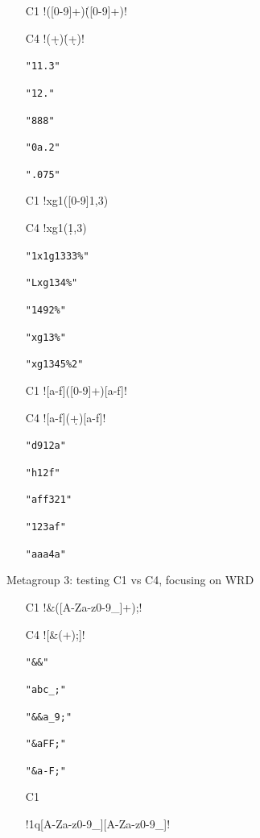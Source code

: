 \begin{footnotesize}
\vspace{-5mm}
\begin{multicols}{3}
\begin{itemize}[noitemsep,topsep=0pt]
\item[C1] \cverb!([0-9]+)\.([0-9]+)!
\item[C4] \cverb!(\d+)\.(\d+)!
\item[] \verb|"11.3"|
\item[] \verb|"12."|
\item[] \verb|"888"|
\item[] \verb|"0a.2"|
\item[] \verb|".075"|
\item[C1] \cverb!xg1([0-9]{1,3})%
\item[C4] \cverb!xg1(\d{1,3})%
\item[] \verb|"1x1g1333%"|
\item[] \verb|"Lxg134%"|
\item[] \verb|"1492%"|
\item[] \verb|"xg13%"|
\item[] \verb|"xg1345%2"|
\item[C1] \cverb![a-f]([0-9]+)[a-f]!
\item[C4] \cverb![a-f](\d+)[a-f]!
\item[] \verb|"d912a"|
\item[] \verb|"h12f"|
\item[] \verb|"aff321"|
\item[] \verb|"123af"|
\item[] \verb|"aaa4a"|
\end{itemize}
\end{multicols}
\pagebreak
Metagroup 3: testing C1 vs C4, focusing on WRD
\vspace{-5mm}
\begin{multicols}{3}
\begin{itemize}[noitemsep,topsep=0pt]
\item[C1] \cverb!&([A-Za-z0-9_]+);!
\item[C4] \cverb![&(\w+);]!
\item[] \verb|"&&"|
\item[] \verb|"abc_;"|
\item[] \verb|"&&a_9;"|
\item[] \verb|"&aFF;"|
\item[] \verb|"&a-F;"|
\item[C1] \begin{scriptsize}\cverb!1q[A-Za-z0-9_][A-Za-z0-9_]!\end{scriptsize}

\end{itemize}
\end{multicols}
\end{footnotesize}
